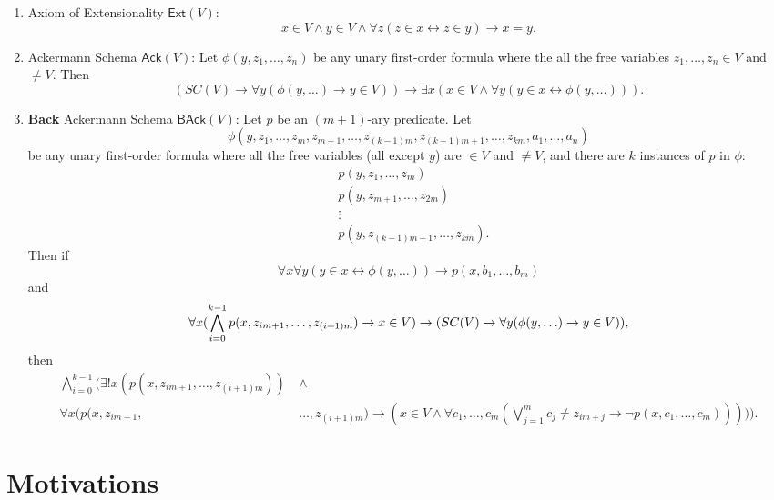 \documentclass{article}
\begin{document}
\begin{enumerate}
	\item Axiom of Extensionality $\textsf{Ext}(V)$: $$x \in V \wedge y \in V \wedge \forall z(z\in x \leftrightarrow z \in y) \rightarrow x = y.$$
	\item Ackermann Schema $\textsf{Ack}(V)$: Let $\phi(y, z_1, \ldots, z_n)$ be any unary first-order formula where the all the free variables $z_1, \ldots, z_n \in V$ and $\ne V$. Then $$(SC(V) \rightarrow \forall y(\phi(y, \ldots) \rightarrow y \in V)) \rightarrow \exists x(x \in V \wedge \forall y(y \in x \leftrightarrow \phi(y, \ldots))).$$
    \item \textbf{Back} Ackermann Schema $\textsf{BAck}(V)$: Let $p$ be an $(m+1)$-ary predicate. Let $$\phi(y, z_1, \ldots, z_m, z_{m+1}, \ldots, z_{(k-1)m}, z_{(k-1)m+1}, \ldots, z_{km}, a_1, \ldots, a_n)$$ be any unary first-order formula where all the free variables (all except $y$) are $\in V$ and $\ne V$, and there are $k$ instances of $p$ in $\phi$:
\begin{align*}
&p(y, z_1, \ldots, z_m) \\ &p(y, z_{m+1}, \ldots, z_{2m}) \\ &\vdots \\ &p(y, z_{(k-1)m+1}, \ldots, z_{km}).
\end{align*}
Then if
$$\forall x \forall y (y \in x \leftrightarrow \phi(y, \ldots)) \rightarrow p(x, b_1, \ldots, b_m)$$
and
$$\forall x(\bigwedge_{i=0}^{k-1}{p(x, z_{im+1}, \ldots, z_{(i+1)m})}\rightarrow x \in V) \rightarrow \\ (SC(V) \rightarrow \forall y(\phi(y, \ldots) \rightarrow y \in V)),$$
then
\begin{align*}
\bigwedge_{i=0}^{k-1}\Big(\exists!x(p(x, z_{im+1}, \ldots, z_{(i+1)m}))\ & \wedge \\ \forall x(p(x, z_{im+1}, &\ldots, z_{(i+1)m}) \rightarrow (x \in V \wedge \forall c_1, \ldots, c_m(\bigvee_{j=1}^m {c_j \ne z_{im+j}} \rightarrow \neg p(x, c_1, \ldots, c_m)) )) \Big).
\end{align*}
\end{enumerate}

\section{Motivations}
\end{document}
